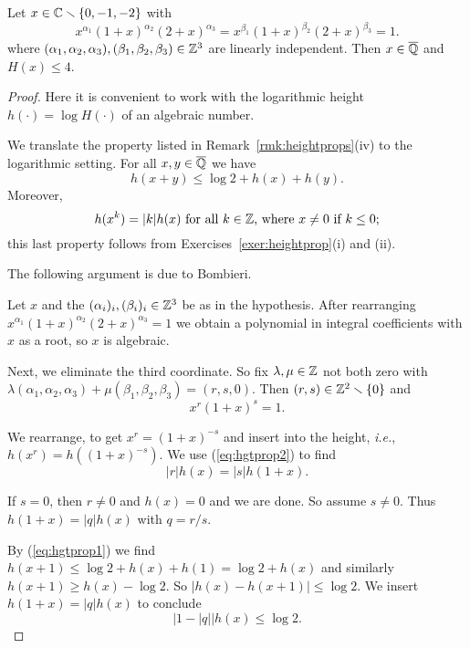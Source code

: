 \begin{theorem}
  \label{thm:hgtbd}
  Let 
  $x\in{\mathbb{C}}\smallsetminus\{0,-1,-2\}$ with
  \begin{equation}
    \label{eq:2mult}
    x^{\alpha_1} (1+x)^{\alpha_2} (2+x)^{\alpha_3} =
    x^{\beta_1} (1+x)^{\beta_2} (2+x)^{\beta_3} = 1.
  \end{equation}
  where
  $(\alpha_1,\alpha_2,\alpha_3),(\beta_1,\beta_2,\beta_3)\in{\mathbb{Z}}^3$
  are linearly independent. Then $x\in{\overline{\mathbb{Q}}}$ and $H(x)\le 4$. 
\end{theorem}
\begin{proof}
  Here it is convenient to work with the logarithmic height $h(\cdot) =
  \log H(\cdot)$ of an algebraic number.

  We translate the property listed in Remark~\ref{rmk:heightprops}(iv)
  to the logarithmic setting.
  For all $x,y\in{\overline{\mathbb{Q}}}$ we have
  \begin{equation}
    \label{eq:hgtprop1}
    h(x+y)\le \log 2 + h(x) + h(y).
  \end{equation}
  Moreover, 
  \begin{equation}
    \label{eq:hgtprop2}
    h(x^k) = |k|
    h(x) \text{ for all $k\in{\mathbb{Z}}$, where $x\not=0$ if $k\le 0$};
  \end{equation}
  this last property follows from Exercises~\ref{exer:heightprop}(i)
  and (ii).

  The following argument is due to Bombieri.

  Let $x$ and the $(\alpha_i)_i,(\beta_i)_i\in{\mathbb{Z}}^3$ be as in the
  hypothesis. After rearranging
  $x^{\alpha_1}(1+x)^{\alpha_2}(2+x)^{\alpha_3}=1$ we obtain a
  polynomial in integral coefficients with $x$ as a root, so $x$ is
  algebraic. 

  
  Next, we eliminate the third coordinate. So fix $\lambda,\mu\in{\mathbb{Z}}$
  not both zero with
  $\lambda(\alpha_1,\alpha_2,\alpha_3)+\mu(\beta_1,\beta_2,\beta_3)=(r,s,0)$.
  Then $(r,s)\in{\mathbb{Z}}^2\smallsetminus\{0\}$ and
  $$
  x^r (1+x)^s = 1.$$

  We rearrange, to get $x^r = (1+x)^{-s}$ and insert into the height,
  \textit{i.e.},
  $h(x^r) = h((1+x)^{-s})$. We use (\ref{eq:hgtprop2}) to find
  \begin{equation*}
    |r| h(x) = |s| h(1+x). 
  \end{equation*}

  If $s=0$, then $r\not=0$ and $h(x)=0$ and we are done. So assume
  $s\not=0$. Thus $h(1+x) = |q| h(x)$ with $q=r/s$. 
  
  By (\ref{eq:hgtprop1}) we find $h(x+1) \le \log 2 + h(x) + h(1) =
  \log 2 +h(x)$ and similarly $h(x+1)\ge h(x)-\log 2$. So
  $|h(x)-h(x+1)|\le \log 2$. We insert $h(1+x) = |q|h(x)$ to conclude
  $$
  \bigl |1 - |q|\bigr |h(x) \le \log 2.$$


\end{proof}
